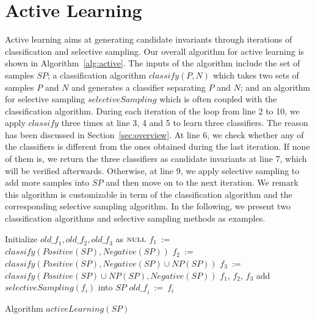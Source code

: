 
\section{Active Learning} %
\label{sec:activelearning}
Active learning aims at generating candidate invariants through iterations of classification and selective sampling. Our overall algorithm for active learning is shown in Algorithm~\ref{alg:active}. The inputs of the algorithm include the set of samples $\mathit{SP}$; a classification algorithm $\mathit{classify}(P,N)$ which takes two sets of samples $P$ and $N$ and generates a classifier separating $P$ and $N$; and an algorithm for selective sampling $\mathit{selectiveSampling}$ which is often coupled with the classification algorithm. During each iteration of the loop from line 2 to 10, we apply $\mathit{classify}$ three times at line 3, 4 and 5 to learn three classifiers. The reason has been discussed in Section~\ref{sec:overview}. At line 6, we check whether any of the classifiers is different from the ones obtained during the last iteration. If none of them is, we return the three classifiers as candidate invariants at line 7, which will be verified afterwards. Otherwise, at line 9, we apply selective sampling to add more samples into $\mathit{SP}$ and then move on to the next iteration. We remark this algorithm is customizable in term of the classification algorithm and the corresponding selective sampling algorithm. In the following, we present two classification algorithms and selective sampling methods as examples.

\begin{algorithm}[t]
\SetAlgoVlined
\Indm
\Indp
Initialize $\mathit{old\_f_1}, \mathit{old\_f_2}, \mathit{old\_f_3}$ as $\textsc{null}$\;
 {
    $f_1$\ := \ $\mathit{classify}(\mathit{Positive}(\mathit{SP}), \mathit{Negative}(\mathit{SP}))$\;
    $f_2$\ := \ $\mathit{classify}(\mathit{Positive}(\mathit{SP}), \mathit{Negative}(\mathit{SP}) \cup \mathit{NP}(\mathit{SP}))$\;
    $f_3$\ := \ $\mathit{classify}(\mathit{Positive}(\mathit{SP}) \cup \mathit{NP}(\mathit{SP}), \mathit{Negative}(\mathit{SP}))$\;
     {
        \Return $f_1$, $f_2$, $f_3$\;
    }
     {
        add $\mathit{selectiveSampling}(f_i)$ into $\mathit{SP}$\;
        $\mathit{old\_f_i}\ := \ f_i$\;
    }
}
\caption{Algorithm $\mathit{activeLearning}(\mathit{SP})$}
\label{alg:active}
\end{algorithm}
\vspace{-0.2cm}

